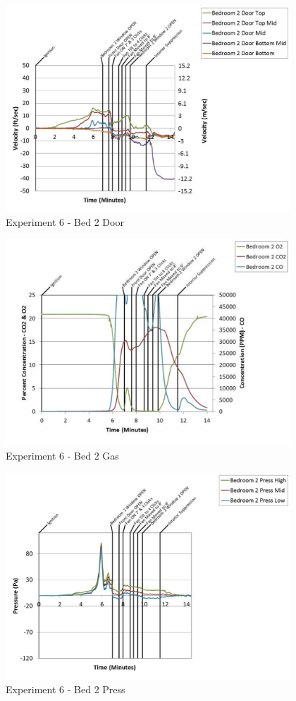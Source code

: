 \documentclass{article}
\begin{document}
\begin{appendices}
	\begin{figure}[h!]
		\centering
		\includegraphics[height=3.05in]{0_Images/Results_Charts/Exp_6_Charts/Bed2Door.pdf}
		\caption{Experiment 6 - Bed 2 Door}
	\end{figure}
 
	\clearpage

	\begin{figure}[h!]
		\centering
		\includegraphics[height=3.05in]{0_Images/Results_Charts/Exp_6_Charts/Bed2Gas.pdf}
		\caption{Experiment 6 - Bed 2 Gas}
	\end{figure}
 

	\begin{figure}[h!]
		\centering
		\includegraphics[height=3.05in]{0_Images/Results_Charts/Exp_6_Charts/Bed2Press.pdf}
		\caption{Experiment 6 - Bed 2 Press}
	\end{figure}
 

\end{appendices}
\end{document}
